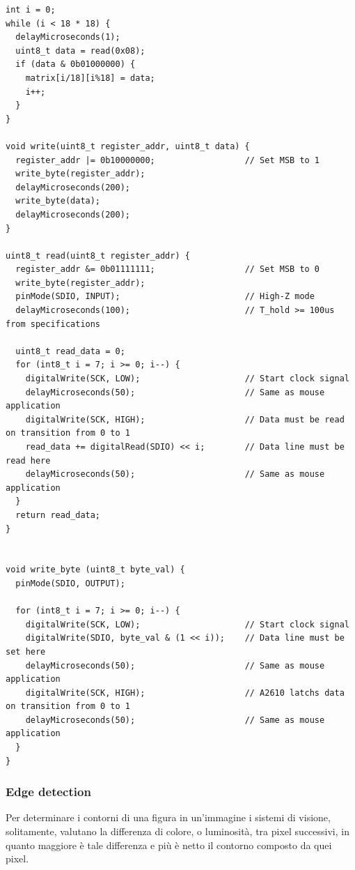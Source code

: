 \documentclass[12pt]{article}
\newenvironment{changemargin}[2]{%
    \begin{list}{}{%
    \setlength{\topsep}{0pt}%
    \setlength{\leftmargin}{#1}%
    \setlength{\rightmargin}{#2}%
    \setlength{\listparindent}{\parindent}%
    \setlength{\itemindent}{\parindent}%
    \setlength{\parsep}{\parskip}%
    }%
    \item[]}{\end{list}}
\begin{document}
        \begin{changemargin}{-2cm}{-2cm}
        \begin{lstlisting}[label={list:protocol_implementation}, style=Arduino, caption=Lettura immagine da sensore, basicstyle=\scriptsize]
int i = 0;
while (i < 18 * 18) {
  delayMicroseconds(1);
  uint8_t data = read(0x08);
  if (data & 0b01000000) {
    matrix[i/18][i%18] = data;
    i++;
  }
}

void write(uint8_t register_addr, uint8_t data) {
  register_addr |= 0b10000000;                  // Set MSB to 1
  write_byte(register_addr);
  delayMicroseconds(200);
  write_byte(data);
  delayMicroseconds(200);
}

uint8_t read(uint8_t register_addr) {
  register_addr &= 0b01111111;                  // Set MSB to 0
  write_byte(register_addr);
  pinMode(SDIO, INPUT);                         // High-Z mode
  delayMicroseconds(100);                       // T_hold >= 100us from specifications

  uint8_t read_data = 0;
  for (int8_t i = 7; i >= 0; i--) {
    digitalWrite(SCK, LOW);                     // Start clock signal
    delayMicroseconds(50);                      // Same as mouse application
    digitalWrite(SCK, HIGH);                    // Data must be read on transition from 0 to 1
    read_data += digitalRead(SDIO) << i;        // Data line must be read here
    delayMicroseconds(50);                      // Same as mouse application
  }
  return read_data;
}


void write_byte (uint8_t byte_val) {
  pinMode(SDIO, OUTPUT);

  for (int8_t i = 7; i >= 0; i--) {
    digitalWrite(SCK, LOW);                     // Start clock signal
    digitalWrite(SDIO, byte_val & (1 << i));    // Data line must be set here
    delayMicroseconds(50);                      // Same as mouse application
    digitalWrite(SCK, HIGH);                    // A2610 latchs data on transition from 0 to 1
    delayMicroseconds(50);                      // Same as mouse application
  }
}       \end{lstlisting}
        \end{changemargin}
        
        \subsubsection{Edge detection}\label{edge_detection}
        Per determinare i contorni di una figura in un'immagine i sistemi di visione, solitamente, valutano la differenza di colore, o luminosità, tra pixel successivi, in quanto maggiore è tale differenza e più è netto il contorno composto da quei pixel.
        
\end{document}
